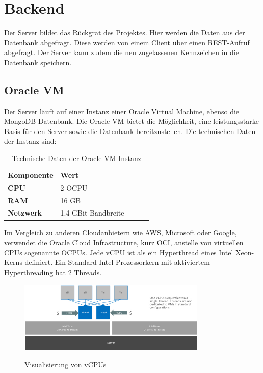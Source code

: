 \section{Backend}
Der Server bildet das Rückgrat des Projektes. Hier werden die Daten aus der Datenbank abgefragt. Diese werden von einem Client über einen REST-Aufruf abgefragt. Der Server kann zudem die neu zugelassenen Kennzeichen in die Datenbank speichern.
\subsection{Oracle VM}
Der Server läuft auf einer Instanz einer Oracle Virtual Machine, ebenso die MongoDB-Datenbank. Die Oracle VM bietet die Möglichkeit, eine leistungsstarke Basis für den Server sowie die Datenbank bereitzustellen. Die technischen Daten der Instanz sind:
\begin{table}[ht]
    \caption{Technische Daten der Oracle VM Instanz}
    \label{tab:vm}
    \begin{tabular}{|l|llll}
    \cline{1-2}
    \textbf{Komponente} & \multicolumn{1}{l|}{\textbf{Wert}} &  &  &  \\ \cline{1-2}
    \textbf{CPU}        & 2 OCPU                             &  &  &  \\ \cline{1-1}
    \textbf{RAM}        & 16 GB                              &  &  &  \\ \cline{1-1}
    \textbf{Netzwerk}   & 1.4 GBit Bandbreite                &  &  &  \\ \cline{1-1}
    \end{tabular}
    \end{table}

    Im Vergleich zu anderen Cloudanbietern wie AWS, Microsoft oder Google, verwendet die Oracle Cloud Infrastructure, kurz OCI, anstelle von virtuellen CPUs sogenannte OCPUs. Jede vCPU ist als ein Hyperthread eines Intel Xeon-Kerns definiert. Ein Standard-Intel-Prozessorkern mit aktiviertem Hyperthreading hat 2 Threads.
\begin{figure}[H]
    \centering
    \includegraphics[width=0.8\textwidth]{pics/vCPU.jpg}
    \caption{Visualisierung von vCPUs}
    \cite{vcpuPic}
    \label{fig:vm:vCPU}
\end{figure}

